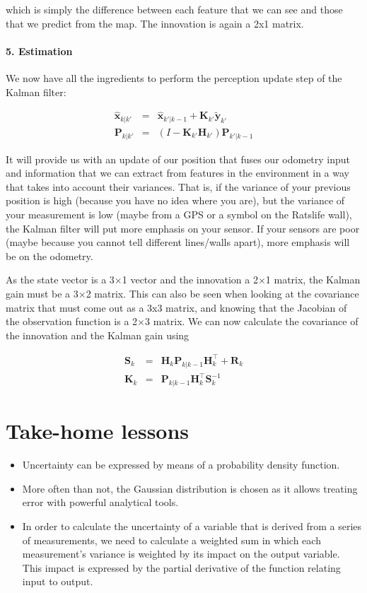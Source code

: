 which is simply the difference between each feature that we can see and those that we predict from the map. The innovation is again a 2x1 matrix.

\paragraph{5. Estimation}
We now have all the ingredients to perform the perception update step of the Kalman filter:

\begin{eqnarray}
\hat{\boldsymbol{x}}_{k|k'} &=& \hat{\boldsymbol{x}}_{k'|k-1} + \boldsymbol{K}_{k'}\tilde{\boldsymbol{y}}_{k'}\\
\boldsymbol{P}_{k|k'} &=& (I - \boldsymbol{K}_{k'} {\boldsymbol{H}_{k'}}) \boldsymbol{P}_{k'|k-1}
\end{eqnarray}

It will provide us with an update of our position that fuses our odometry input and information  that we can extract from features in the environment in a way that takes into account their variances. That is, if the variance of your previous position is high (because you have no idea where you are), but the variance of your measurement is low (maybe from a GPS or a symbol on the Ratslife wall), the Kalman filter will put more emphasis on your sensor. If your sensors are poor (maybe because you cannot tell different lines/walls apart), more emphasis will be on the odometry.

As the state vector is a 3$\times$1 vector and the innovation a 2$\times$1 matrix, the Kalman gain must be a 3$\times$2 matrix. This can also be seen when looking at the covariance matrix that must come out as a 3x3 matrix, and knowing that the Jacobian of the observation function is a 2$\times$3 matrix. We can now calculate the covariance of the innovation and the Kalman gain using

\begin{eqnarray}
\boldsymbol{S}_{k}&=&{\boldsymbol{H}_{k}}\boldsymbol{P}_{k|k-1}{\boldsymbol{H}_{k}^\top}+\boldsymbol{R}_{k}\\
\boldsymbol{K}_{k}&=&\boldsymbol{P}_{k|k-1}{\boldsymbol{H}_{k}^\top}\boldsymbol{S}_{k}^{-1}
\end{eqnarray}

\section{Take-home lessons}
\begin{itemize}
\item Uncertainty can be expressed by means of a probability density function.
\item More often than not, the Gaussian distribution is chosen as it allows treating error with powerful analytical tools.
\item In order to calculate the uncertainty of a variable that is derived from a series of measurements, we need to calculate a weighted sum in which each measurement's variance is weighted by its impact on the output variable. This impact is expressed by the partial derivative of the function relating input to output.
\end{itemize}

